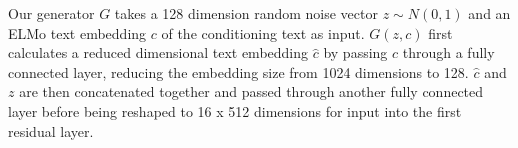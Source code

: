 Our generator $G$ takes a 128 dimension random noise vector $z \sim N(0, 1)$ and an ELMo text embedding $c$ of the conditioning text as input. $G(z, c)$ first calculates a reduced dimensional text embedding $\hat{c}$ by passing $c$ through a fully connected layer, reducing the embedding size from 1024 dimensions to 128. $\hat{c}$ and $z$ are then concatenated together and passed through another fully connected layer before being reshaped to 16 x 512 dimensions for input into the first residual  layer.